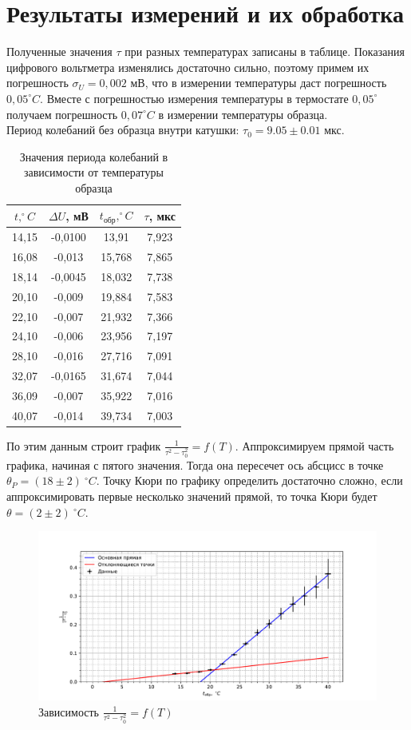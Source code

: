\documentclass[a4paper, 12pt]{article}
\begin{document}
	\section* {Результаты измерений и их обработка}
	Полученные значения $\tau$ при разных температурах записаны в таблице. Показания цифрового вольтметра изменялись достаточно сильно, поэтому примем их погрешность $\sigma_U = 0,002$ мВ, что в измерении температуры даст погрешность $0,05^{\circ} C$. Вместе с погрешностью измерения температуры в термостате $0,05^{\circ}$ получаем погрешность $0,07^{\circ} C$ в измерении температуры образца.\\
	Период колебаний без образца внутри катушки: $\tau_0 = 9.05 \pm 0.01$ мкс.
	\begin{table}[h!]
		\centering
		\begin{tabular}{|c|c|c|c|}
			\hline
			$t, ^{\circ}C$ & $\Delta U$, мВ & $t_{\text{обр}}, ^{\circ} C$ & $\tau$, мкс \\ \hline
			14,15 & -0,0100 & 13,91 & 7,923 \\ \hline
			16,08 & -0,013 & 15,768 & 7,865 \\ \hline
			18,14 & -0,0045 & 18,032 & 7,738 \\ \hline
			20,10 & -0,009 & 19,884 & 7,583 \\ \hline
			22,10 & -0,007 & 21,932 & 7,366 \\ \hline
			24,10 & -0,006 & 23,956 & 7,197 \\ \hline
			28,10 & -0,016 & 27,716 & 7,091 \\ \hline
			32,07 & -0,0165 & 31,674 & 7,044 \\ \hline
			36,09 & -0,007 & 35,922 & 7,016 \\ \hline
			40,07 & -0,014 & 39,734 & 7,003 \\ \hline
		\end{tabular}
		\caption{Значения периода колебаний в зависимости от температуры образца}
	\end{table}

	По этим данным строит график $\frac{1}{\tau^2 - \tau_0^2} = f(T)$. Аппроксимируем прямой часть графика, начиная с пятого значения. Тогда она пересечет ось абсцисс в точке $\theta_P = (18 \pm 2)\ ^{\circ}C$.
	Точку Кюри по графику определить достаточно сложно, если аппроксимировать первые несколько значений прямой, то точка Кюри будет $\theta = (2 \pm 2)\ ^{\circ}C$.
	\begin{figure}[H]
		\centering
		\includegraphics[width = \textwidth]{graph.pdf}
		\caption{Зависимость $\frac{1}{\tau^2 - \tau_0^2} = f(T)$}
	\end{figure}
\end{document}
